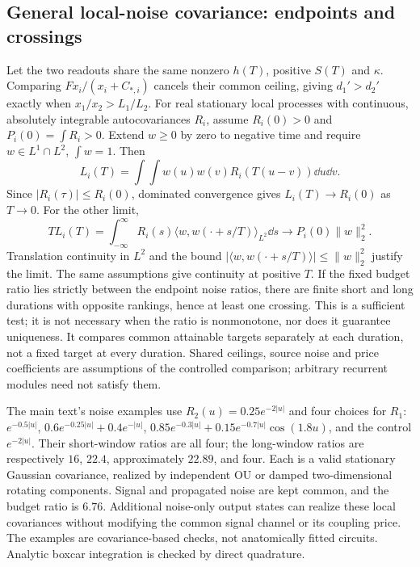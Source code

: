\subsection{General local-noise covariance: endpoints and crossings}

Let the two readouts share the same nonzero \(h(T)\), positive
\(S(T)\) and \(\kappa\). Comparing
\(F x_i/(x_i+C_{*,i})\) cancels their common ceiling, giving
\(d_1'>d_2'\) exactly when \(x_1/x_2>L_1/L_2\).
For real stationary local processes with continuous, absolutely
integrable autocovariances \(R_i\), assume \(R_i(0)>0\) and
\(P_i(0)=\int R_i>0\). Extend \(w\ge0\) by zero to negative
time and require \(w\in L^1\cap L^2\), \(\int w=1\). Then
\[
 L_i(T)=\int\!\!\int w(u)w(v)R_i(T(u-v))\dd u\dd v.
\]
Since \(|R_i(\tau)|\le R_i(0)\), dominated convergence gives
\(L_i(T)\to R_i(0)\) as \(T\to0\). For the other limit,
\[
 T L_i(T)=\int_{-\infty}^{\infty}R_i(s)
                   \langle w,w(\cdot+s/T)\rangle_{L^2}\dd s
       \longrightarrow P_i(0)\|w\|_2^2.
\]
Translation continuity in \(L^2\) and the bound
\(|\langle w,w(\cdot+s/T)\rangle|\le\|w\|_2^2\)
justify the limit. The same assumptions give continuity at
positive \(T\). If the fixed budget ratio lies strictly between
the endpoint noise ratios, there are finite short and long
durations with opposite rankings, hence at least one crossing.
This is a sufficient test; it is not necessary when the ratio
is nonmonotone, nor does it guarantee uniqueness. It compares
common attainable targets separately at each duration, not a
fixed target at every duration. Shared ceilings, source noise and
price coefficients are assumptions of the controlled comparison;
arbitrary recurrent modules need not satisfy them.

The main text's noise examples use
\(R_2(u)=0.25e^{-2|u|}\) and four choices for \(R_1\):
\(e^{-0.5|u|}\),
\(0.6e^{-0.25|u|}+0.4e^{-|u|}\),
\(0.85e^{-0.3|u|}+0.15e^{-0.7|u|}\cos(1.8u)\), and
the control \(e^{-2|u|}\). Their short-window ratios are all
four; the long-window ratios are respectively \(16\), \(22.4\),
approximately \(22.89\), and four. Each is a valid stationary
Gaussian covariance, realized by independent OU or damped
two-dimensional rotating components. Signal and propagated noise
are kept common, and the budget ratio is \(6.76\). Additional
noise-only output states can realize these local covariances
without modifying the common signal channel or its coupling price.
The examples are covariance-based checks, not anatomically fitted
circuits. Analytic boxcar integration is checked by direct quadrature.


